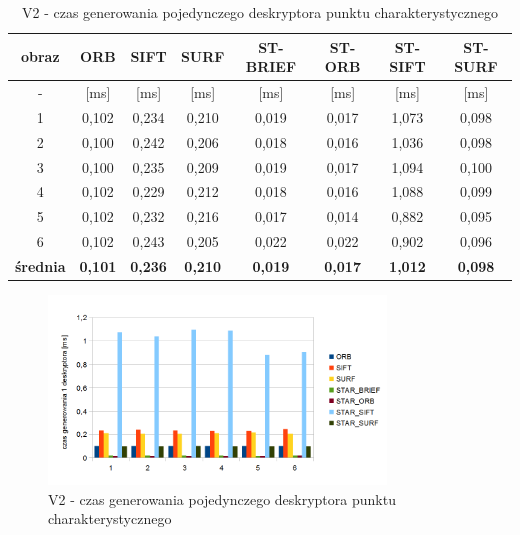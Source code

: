 \begin{table}[htbp]
  \centering
  \caption{V2 - czas generowania pojedynczego deskryptora punktu charakterystycznego}
    \begin{tabular}{|c|c|c|c|c|c|c|c|}\hline

    obraz & \textbf{ORB} & \textbf{SIFT} & \textbf{SURF} & \textbf{ST-BRIEF} & \textbf{ST-ORB} & \textbf{ST-SIFT} & \textbf{ST-SURF} \\\hline

    - & [ms] & [ms] & [ms] & [ms] & [ms] & [ms] & [ms] \\\hline
    1 & 0,102 & 0,234 & 0,210 & 0,019 & 0,017 & 1,073 & 0,098 \\
    2 & 0,100 & 0,242 & 0,206 & 0,018 & 0,016 & 1,036 & 0,098 \\
    3 & 0,100 & 0,235 & 0,209 & 0,019 & 0,017 & 1,094 & 0,100 \\
    4 & 0,102 & 0,229 & 0,212 & 0,018 & 0,016 & 1,088 & 0,099 \\
    5 & 0,102 & 0,232 & 0,216 & 0,017 & 0,014 & 0,882 & 0,095 \\
    6 & 0,102 & 0,243 & 0,205 & 0,022 & 0,022 & 0,902 & 0,096 \\\hline
    \textbf{średnia} & \textbf{0,101} & \textbf{0,236} & \textbf{0,210} & \textbf{0,019} & \textbf{0,017} & \textbf{1,012} & \textbf{0,098} \\\hline
    
    \end{tabular}%
  \label{tab:v2_f3}%
\end{table}%


\begin{figure}
\centering
\includegraphics[width=0.8\textwidth]{pict/slowik/v2/f3.png}
\caption{V2 - czas generowania pojedynczego deskryptora punktu charakterystycznego}
\label{fig:v2_f3}
\end{figure}


